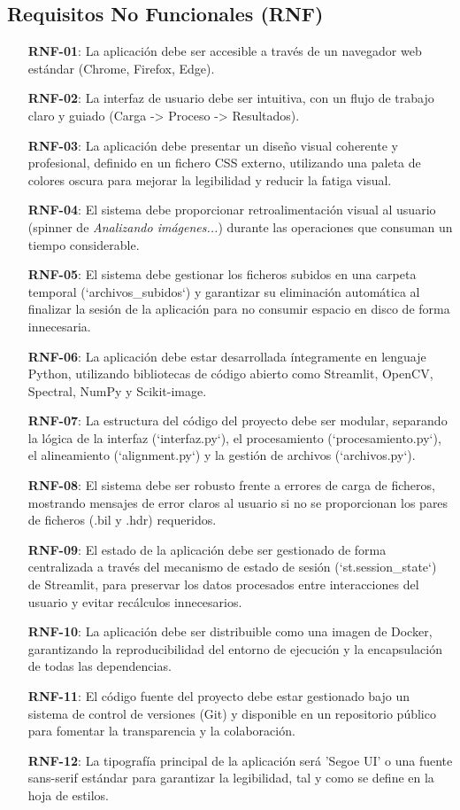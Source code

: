 \subsection{Requisitos No Funcionales (RNF)}
\begin{itemize}
    \item[\textbf{RNF-01}:] La aplicación debe ser accesible a través de un navegador web estándar (Chrome, Firefox, Edge).
    \item[\textbf{RNF-02}:] La interfaz de usuario debe ser intuitiva, con un flujo de trabajo claro y guiado (Carga -> Proceso -> Resultados).
    \item[\textbf{RNF-03}:] La aplicación debe presentar un diseño visual coherente y profesional, definido en un fichero CSS externo, utilizando una paleta de colores oscura para mejorar la legibilidad y reducir la fatiga visual.
    \item[\textbf{RNF-04}:] El sistema debe proporcionar retroalimentación visual al usuario (spinner de \textit{Analizando imágenes...}) durante las operaciones que consuman un tiempo considerable.
    \item[\textbf{RNF-05}:] El sistema debe gestionar los ficheros subidos en una carpeta temporal (`archivos\_subidos`) y garantizar su eliminación automática al finalizar la sesión de la aplicación para no consumir espacio en disco de forma innecesaria.
    \item[\textbf{RNF-06}:] La aplicación debe estar desarrollada íntegramente en lenguaje Python, utilizando bibliotecas de código abierto como Streamlit, OpenCV, Spectral, NumPy y Scikit-image.
    \item[\textbf{RNF-07}:] La estructura del código del proyecto debe ser modular, separando la lógica de la interfaz (`interfaz.py`), el procesamiento (`procesamiento.py`), el alineamiento (`alignment.py`) y la gestión de archivos (`archivos.py`).
    \item[\textbf{RNF-08}:] El sistema debe ser robusto frente a errores de carga de ficheros, mostrando mensajes de error claros al usuario si no se proporcionan los pares de ficheros (.bil y .hdr) requeridos.
    \item[\textbf{RNF-09}:] El estado de la aplicación debe ser gestionado de forma centralizada a través del mecanismo de estado de sesión (`st.session\_state`) de Streamlit, para preservar los datos procesados entre interacciones del usuario y evitar recálculos innecesarios.
    \item[\textbf{RNF-10}:] La aplicación debe ser distribuible como una imagen de Docker, garantizando la reproducibilidad del entorno de ejecución y la encapsulación de todas las dependencias.
    \item[\textbf{RNF-11}:] El código fuente del proyecto debe estar gestionado bajo un sistema de control de versiones (Git) y disponible en un repositorio público para fomentar la transparencia y la colaboración.
    \item[\textbf{RNF-12}:] La tipografía principal de la aplicación será 'Segoe UI' o una fuente sans-serif estándar para garantizar la legibilidad, tal y como se define en la hoja de estilos.
\end{itemize}

